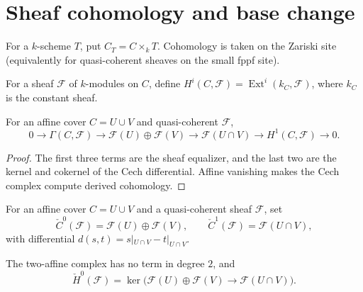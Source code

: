 \chapter{Sheaf cohomology and base change}
\label{mk-ch-cohomology}

For a \(k\)-scheme \(T\), put \(C_T=C\times_kT\).  Cohomology is taken on
the Zariski site (equivalently for quasi-coherent sheaves on the small fppf
site).

\begin{definition}
  \label{mk-def-module-cohomology}
  \cite{stacks-cohomology}
  For a sheaf \(\mathcal F\) of \(k\)-modules on \(C\), define
  \(H^i(C,\mathcal F)=\operatorname{Ext}^i(k_C,\mathcal F)\), where \(k_C\)
  is the constant sheaf.
\end{definition}

\begin{proposition}
  \label{mk-prop-cech-short-exact}
  \cite{stacks-cohomology-schemes}
  For an affine cover \(C=U\cup V\) and quasi-coherent \(\mathcal F\),
  \[
    0\to\Gamma(C,\mathcal F)\to\mathcal F(U)\oplus\mathcal F(V)
    \to\mathcal F(U\cap V)\to H^1(C,\mathcal F)\to0.
  \]
\end{proposition}

\begin{proof}
  The first three terms are the sheaf equalizer, and the last two are the
  kernel and cokernel of the Cech differential.  Affine vanishing makes the
  Cech complex compute derived cohomology.
\end{proof}

\begin{definition}
  \label{mk-def-cech-complex}
  \cite{stacks-cohomology-schemes}
  For an affine cover \(C=U\cup V\) and a quasi-coherent sheaf \(\mathcal F\),
  set
  \[
    \check C^0(\mathcal F)=\mathcal F(U)\oplus\mathcal F(V),\qquad
    \check C^1(\mathcal F)=\mathcal F(U\cap V),
  \]
  with differential \(d(s,t)=s|_{U\cap V}-t|_{U\cap V}\).
\end{definition}

\begin{lemma}
  \label{mk-lem-cech-differential}
  \cite{stacks-cohomology-schemes}
  The two-affine complex has no term in degree \(2\), and
  \[
    \check H^0(\mathcal F)=
    \ker\bigl(\mathcal F(U)\oplus\mathcal F(V)\to\mathcal F(U\cap V)\bigr).
  \]
\end{lemma}

